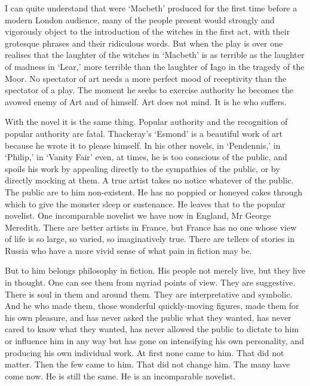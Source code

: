 I can quite understand that were ‘Macbeth’ produced for the first time before a modern London audience, many of the people present would strongly and vigorously object to the introduction of the witches in the first act, with their grotesque phrases and their ridiculous words. But when the play is over one realises that the laughter of the witches in ‘Macbeth’ is as terrible as the laughter of madness in ‘Lear,’ more terrible than the laughter of Iago in the tragedy of the Moor. No spectator of art needs a more perfect mood of receptivity than the spectator of a play. The moment he seeks to exercise authority he becomes the avowed enemy of Art and of himself. Art does not mind. It is he who suffers.\par

With the novel it is the same thing. Popular authority and the recognition of popular authority are fatal. Thackeray’s ‘Esmond’ is a beautiful work of art because he wrote it to please himself. In his other novels, in ‘Pendennis,’ in ‘Philip,’ in ‘Vanity Fair’ even, at times, he is too conscious of the public, and spoils his work by appealing directly to the sympathies of the public, or by directly mocking at them. A true artist takes no notice whatever of the public. The public are to him non-existent. He has no poppied or honeyed cakes through which to give the monster sleep or sustenance. He leaves that to the popular novelist. One incomparable novelist we have now in England, Mr George Meredith. There are better artists in France, but France has no one whose view of life is so large, so varied, so imaginatively true. There are tellers of stories in Russia who have a more vivid sense of what pain in fiction may be.\par

But to him belongs philosophy in fiction. His people not merely live, but they live in thought. One can see them from myriad points of view. They are suggestive. There is soul in them and around them. They are interpretative and symbolic. And he who made them, those wonderful quickly-moving figures, made them for his own pleasure, and has never asked the public what they wanted, has never cared to know what they wanted, has never allowed the public to dictate to him or influence him in any way but has gone on intensifying his own personality, and producing his own individual work. At first none came to him. That did not matter. Then the few came to him. That did not change him. The many have come now. He is still the same. He is an incomparable novelist.\par

